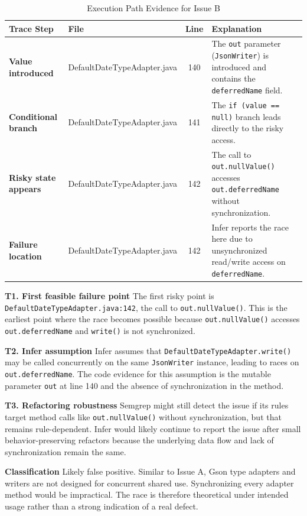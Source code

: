 \documentclass[11pt]{article}
\begin{document}
\begin{table}[H]
\centering
\caption{Execution Path Evidence for Issue B}
\begin{tabularx}{\textwidth}{>{\bfseries}l l c X}
\toprule
Trace Step & File & Line & Explanation \\
\midrule
Value introduced & DefaultDateTypeAdapter.java & 140 & The \texttt{out} parameter (\texttt{JsonWriter}) is introduced and contains the \texttt{deferredName} field. \\
Conditional branch & DefaultDateTypeAdapter.java & 141 & The \texttt{if (value == null)} branch leads directly to the risky access. \\
Risky state appears & DefaultDateTypeAdapter.java & 142 & The call to \texttt{out.nullValue()} accesses \texttt{out.deferredName} without synchronization. \\
Failure location & DefaultDateTypeAdapter.java & 142 & Infer reports the race here due to unsynchronized read/write access on \texttt{deferredName}. \\
\bottomrule
\end{tabularx}
\end{table}

\textbf{T1. First feasible failure point} The first risky point is \texttt{DefaultDateTypeAdapter.java:142}, the call to \texttt{out.nullValue()}. This is the earliest point where the race becomes possible because \texttt{out.nullValue()} accesses \texttt{out.deferredName} and \texttt{write()} is not synchronized.

\textbf{T2. Infer assumption} Infer assumes that \texttt{DefaultDateTypeAdapter.write()} may be called concurrently on the same \texttt{JsonWriter} instance, leading to races on \texttt{out.deferredName}. The code evidence for this assumption is the mutable parameter \texttt{out} at line 140 and the absence of synchronization in the method.

\textbf{T3. Refactoring robustness} Semgrep might still detect the issue if its rules target method calls like \texttt{out.nullValue()} without synchronization, but that remains rule-dependent. Infer would likely continue to report the issue after small behavior-preserving refactors because the underlying data flow and lack of synchronization remain the same.

\textbf{Classification} Likely false positive. Similar to Issue A, Gson type adapters and writers are not designed for concurrent shared use. Synchronizing every adapter method would be impractical. The race is therefore theoretical under intended usage rather than a strong indication of a real defect.
\end{document}
